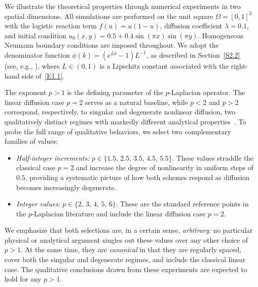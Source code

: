 \documentclass[final,12pt,3p]{elsarticle}
\theoremstyle{plain}
\theoremstyle{definition}
\theoremstyle{remark}
\begin{document}
We illustrate the theoretical properties through numerical experiments in two spatial dimensions. 
All simulations are performed on the unit square $\Omega = [0,1]^2$ with the logistic reaction term $f(u) = u(1-u)$, diffusion coefficient $\lambda = 0.1$, and initial condition $u_0(x,y) = 0.5 + 0.4\sin(\pi x)\sin(\pi y)$.
Homogeneous Neumann boundary conditions are imposed throughout.
We adopt the denominator function $\phi(k) = (e^{Lk}-1)L^{-1}$, as described in Section~\ref{S2.2} (see, e.g., \cite{Ehrhardt2013, Zinihi2025NSFD}), where $L\in(0,1)$ is a Lipschitz constant associated with the right-hand side of~\eqref{E1.1}.

The exponent $p > 1$ is the defining parameter of the $p$-Laplacian operator.
The linear diffusion case $p = 2$ serves as a natural baseline, while $p < 2$ and $p > 2$ correspond, respectively, to singular and degenerate nonlinear diffusion, two qualitatively distinct regimes with markedly different analytical properties~\cite{Lindqvist2019, Vazquez2006}.
To probe the full range of qualitative behaviors, we select two complementary families of values:
\begin{itemize}
\item \emph{Half-integer increments:} $p \in \{1.5,\, 2.5,\, 3.5,\, 4.5,\, 5.5\}$.
These values straddle the classical case $p = 2$ and increase the degree of nonlinearity in uniform steps of $0.5$, providing a systematic picture of how both schemes respond as diffusion becomes increasingly degenerate.
%
\item \emph{Integer values:} $p \in \{2,\, 3,\, 4,\, 5,\, 6\}$. 
These are the standard reference points in the $p$-Laplacian literature and include the linear diffusion case $p = 2$.
\end{itemize}
We emphasize that both selections are, in a certain sense, \emph{arbitrary}: no particular physical or analytical argument singles out these values over any other choice of $p > 1$.
At the same time, they are \emph{canonical} in that they are regularly spaced, cover both the singular and degenerate regimes, and include the classical linear case.
The qualitative conclusions drawn from these experiments are expected to hold for any $p > 1$.
\end{document}
